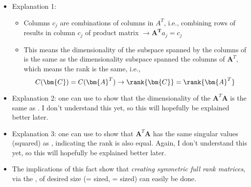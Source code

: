 \begin{itemize}
\begin{itemize}
    \item Explanation 1:
    \begin{itemize}
      \item Columns \(c_j\) are combinations of columns in \(A^T\), i.e., combining rows of  results in column \(c_j\) of product matrix \(\rightarrow \bm{A^T}a_j=c_j \)
      \item This means the dimensionality of the subspace spanned by the columns of  is the same as the dimensionality subspace spanned the columns of \(\bm{A}^T\), which means the rank is the same, i.e.,
      \[%
      C(\bm{C})=C(\bm{A}^T)\rightarrow \rank{\bm{C}} = \rank{\bm{A}^T} 
      \]%
    \end{itemize}
    \item Explanation 2: one can use \hyperref[tbd]{} to show that the dimensionality of the \(\bm{A}^T\bm{A}\) is the same as . I don't understand this yet, so this will hopefully be explained better later.
    \item Explanation 3: one can use \hyperref[tbd]{} to show that \(\bm{A}^T\bm{A}\) has the same singular values (squared) as , indicating the rank is also equal. Again, I don't understand this yet, so this will hopefully be explained better later.
    \item The implications of this fact show that \emph{creating symmetric full rank matrices}, via the \hyperref[Hadamard Multiplication]{}, of desired size (= sized, = sized) can easily be done.
  \end{itemize}
    

\end{itemize}

